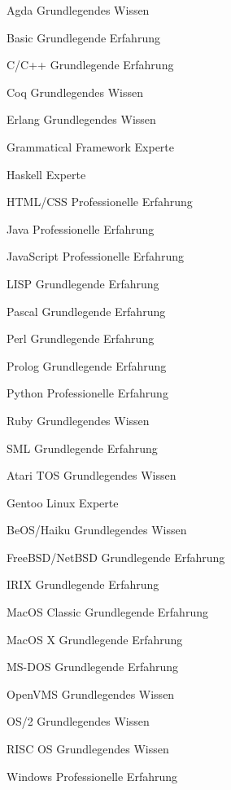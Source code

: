 \documentclass[11pt, a4]{academic-cv}
\begin{document}
\begin{cvskills}
\cvskill
{}
{Agda}
{Grundlegendes Wissen}

\cvskill
{}
{Basic}
{Grundlegende Erfahrung}

\cvskill
{}
{C/C++}
{Grundlegende Erfahrung}

\cvskill
{}
{Coq}
{Grundlegendes Wissen}

\cvskill
{}
{Erlang}
{Grundlegendes Wissen}

\cvskill
{}
{Grammatical Framework}
{Experte}

\cvskill
{}
{Haskell}
{Experte}

\cvskill
{}
{HTML/CSS}
{Professionelle Erfahrung}

\cvskill
{}
{Java}
{Professionelle Erfahrung}

\cvskill
{}
{JavaScript}
{Professionelle Erfahrung}

\cvskill
{}
{LISP}
{Grundlegende Erfahrung}

\cvskill
{}
{Pascal}
{Grundlegende Erfahrung}

\cvskill
{}
{Perl}
{Grundlegende Erfahrung}

\cvskill
{}
{Prolog}
{Grundlegende Erfahrung}

\cvskill
{}
{Python}
{Professionelle Erfahrung}

\cvskill
{}
{Ruby}
{Grundlegendes Wissen}

\cvskill
{}
{SML}
{Grundlegende Erfahrung}

\end{cvskills}

\begin{cvskills}
\cvskill
{}
{Atari TOS}
{Grundlegendes Wissen}

\cvskill
{}
{Gentoo Linux}
{Experte}

\cvskill
{}
{BeOS/Haiku}
{Grundlegendes Wissen}

\cvskill
{}
{FreeBSD/NetBSD}
{Grundlegende Erfahrung}

\cvskill
{}
{IRIX}
{Grundlegende Erfahrung}

\cvskill
{}
{MacOS Classic}
{Grundlegende Erfahrung}

\cvskill
{}
{MacOS X}
{Grundlegende Erfahrung}

\cvskill
{}
{MS-DOS}
{Grundlegende Erfahrung}

\cvskill
{}
{OpenVMS}
{Grundlegendes Wissen}

\cvskill
{}
{OS/2}
{Grundlegendes Wissen}

\cvskill
{}
{RISC OS}
{Grundlegendes Wissen}

\cvskill
{}
{Windows}
{Professionelle Erfahrung}

\end{cvskills}
\end{document}
